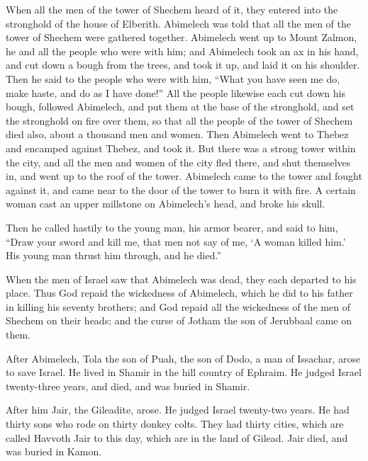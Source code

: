 \myverse{}When all the men of the tower of Shechem heard of it, they entered
into the stronghold of the house of Elberith.
\myverse{}Abimelech was told that all the men of the tower of Shechem were gathered
together.
\myverse{}Abimelech went up to Mount Zalmon, he and all the people who were with him;
and Abimelech took an ax in his hand, and cut down a bough from the trees, and took it up, and laid it
on his shoulder. Then he said to the people who were with him, “What you have seen me do, make haste,
and do as I have done!”
\myverse{}All the people likewise each cut down his bough, followed Abimelech, and put
them at the base of the stronghold, and set the stronghold on fire over them, so that all the people of
the tower of Shechem died also, about a thousand men and women.
\myverse{}Then Abimelech went to Thebez and encamped against Thebez, and took it.
\myverse{}But there was a strong tower within the city, and all the men and women of
the city fled there, and shut themselves in, and went up to the roof of the tower.
\myverse{}Abimelech came to the tower and fought against it, and came near to the door
of the tower to burn it with fire.
\myverse{}A certain woman cast an upper millstone on Abimelech’s head, and broke his
skull.

\myverse{}Then he called hastily to the young man, his armor bearer, and
said to him, “Draw your sword and kill me, that men not say of me, ‘A woman killed him.’ His young man
thrust him through, and he died.”

\myverse{}When the men of Israel saw that Abimelech was dead, they each
departed to his place.
\myverse{}Thus God repaid the wickedness of Abimelech, which he did to his father in
killing his seventy brothers;
\myverse{}and God repaid all the wickedness of the men of Shechem on their heads; and
the curse of Jotham the son of Jerubbaal came on them.


\mychapter{} \myverse*{}After Abimelech, Tola the son of Puah, the son of Dodo, a man
of Issachar, arose to save Israel. He lived in Shamir in the hill country of Ephraim.
\myverse{}He judged Israel twenty-three years, and died, and was buried in Shamir.

\myverse{}After him Jair, the Gileadite, arose. He judged Israel twenty-two
years.
\myverse{}He had thirty sons who rode on thirty donkey colts. They had thirty cities,
which are called Havvoth Jair to this day, which are in the land of Gilead.
\myverse{}Jair died, and was buried in Kamon.

